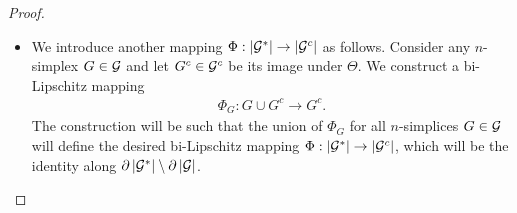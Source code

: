 \documentclass[10pt,a4paper]{article}
\begin{document}
\begin{proof}
\begin{itemize}
        
        
        
        
        \item 
        We introduce another mapping $\Phi : \left| {\mathcal G}^\ast \right| \rightarrow \left| {\mathcal G}^{c} \right|$ as follows. 
        Consider any $n$-simplex $G \in {\mathcal G}$ and let $G^c \in {\mathcal G}^{c}$ be its image under $\Theta$.
        We construct a bi-Lipschitz mapping 
        \begin{align*}
            \Phi_{G} : G \cup G^{c} \rightarrow G^{c}.
        \end{align*}
        The construction will be such that the union of $\Phi_{G}$ for all $n$-simplices $G \in {\mathcal G}$
        will define the desired bi-Lipschitz mapping $\Phi : \left| {\mathcal G}^\ast \right| \rightarrow \left| {\mathcal G}^{c} \right|$,
        which will be the identity along $\partial\left| {\mathcal G}^\ast \right| \setminus \partial\left| {\mathcal G} \right|$.
        

\end{itemize}
\end{proof}
\end{document}
